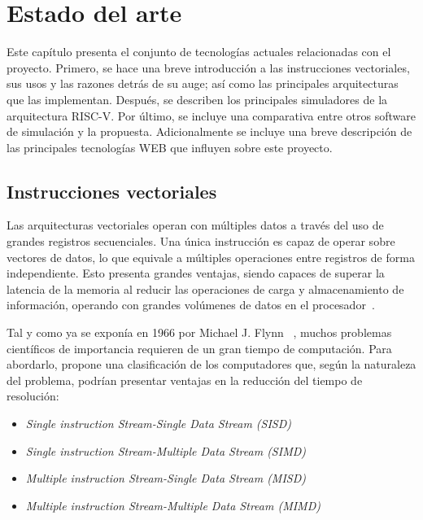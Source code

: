 \chapter{Estado del arte}\label{chap:state-of-the-art}

Este capítulo presenta el conjunto de tecnologías actuales relacionadas con el
proyecto. Primero, se hace una breve introducción a las instrucciones vectoriales, sus
usos y las razones detrás de su auge; así como las principales arquitecturas
que las implementan. Después, se describen los principales simuladores de la
arquitectura RISC-V. Por último, se incluye una comparativa entre otros software de simulación y la
propuesta. Adicionalmente se incluye una breve descripción de las principales tecnologías WEB que influyen sobre este proyecto.

\section{Instrucciones vectoriales}\label{vector-instructions}

Las arquitecturas vectoriales operan con múltiples datos a través del uso de
grandes registros secuenciales. Una única instrucción es capaz de operar sobre
vectores de datos, lo que equivale a múltiples operaciones entre registros de
forma independiente. Esto presenta grandes ventajas, siendo capaces de superar
la latencia de la memoria al reducir las operaciones de carga y almacenamiento
de información, operando con grandes volúmenes de datos en el
procesador~\cite{hennessy2011computer}.

Tal y como ya se exponía en 1966 por Michael J. Flynn ~\cite{1447203}, muchos
problemas científicos de importancia requieren de un gran tiempo de
computación. Para abordarlo, propone una clasificación de los computadores que, según la naturaleza del problema, podrían presentar ventajas en la reducción del
tiempo de resolución:

\begin{itemize}
    \item \textit{Single instruction Stream-Single Data Stream (SISD)}
    \item \textit{Single instruction Stream-Multiple Data Stream (SIMD)}
    \item \textit{Multiple instruction Stream-Single Data Stream (MISD)}
    \item \textit{Multiple instruction Stream-Multiple Data Stream (MIMD)}
\end{itemize}

